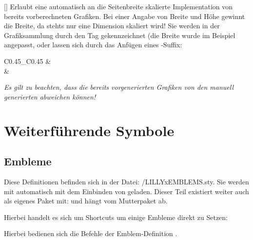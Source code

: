 []
Erlaubt eine automatisch an die Seitenbreite skalierte Implementation von bereits vorberechneten Grafiken. Bei einer Angabe von Breite und Höhe gewinnt die Breite, da stehts nur eine Dimension skaliert wird! Sie werden in der Grafiksammlung durch den Tag  gekennzeichnet (die Breite wurde im Beispiel angepasst, oder lassen sich durch das Anfügen eines -Suffix:
\begin{center}
    \begin{tabular}{C{0.45\linewidth}_C{0.45\linewidth}}
         &  \\
        \tiny {} & \tiny{}
    \end{tabular}
\end{center}
\emph{Es gilt zu beachten, dass die bereits vorgenerierten Grafiken von den manuell generierten abweichen können!}
%
%
%
\section{Weiterführende Symbole}
%
%
%
\subsection{Embleme}
Diese Definitionen befinden sich in der Datei: {\ltt\LILLYxPATHxGRAPHICS/LILLYxEMBLEMS.sty}. Sie werden mit  automatisch mit dem Einbinden von\newline {} geladen.\medskip\newline
Dieser Teil existiert weiter auch als eigenes Paket mit:  und hängt vom Mutterpaket ab. 

%
%
%

\vspace{-\baselineskip}
\vspace{-\baselineskip}
\vspace{-\baselineskip}
\vspace{-\baselineskip}
\vspace{-\baselineskip}
Hierbei handelt es sich um Shortcuts um einige Embleme direkt zu Setzen:\medskip
\begin{center}
\end{center}
Hierbei bedienen sich die Befehle der Emblem-Definition .

